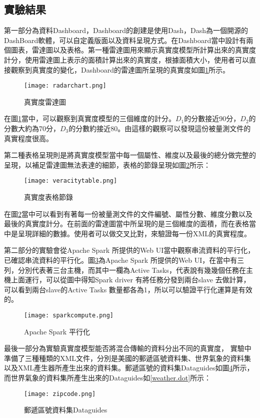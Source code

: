 \subsection{實驗結果}
第一部分為資料Dashboard，Dashboard的創建是使用Dash\cite{dash}，Dash為一個開源的DashBoard軟體，可以自定義版面以及資料呈現方式。在Dashboard當中設計有兩個圖表，雷達圖以及表格。第一種雷達圖用來顯示真實度模型所計算出來的真實度計分，使用雷達圖上表示的面積計算出來的真實度，根據面積大小，使用者可以直接觀察到真實度的變化，Dashboard的雷達圖所呈現的真實度如圖\ref{radarchart}所示。
\begin{figure}[H]
\centering
\graphicspath{{/Users/FUDA/Documents/masterThesis/image/}}
\texttt{[image: radarchart.png]}
\caption{真實度雷達圖}
\label{radarchart}
\end{figure}

在圖\ref{radarchart}當中，可以觀察到真實度模型的三個維度的計分。$D_1$的分數接近90分，$D_2$的分數大約為70分，$D_3$的分數約接近80。由這樣的觀察可以發現這份被量測文件的真實程度很高。\\\par
第二種表格呈現則是將真實度模型當中每一個屬性、維度以及最後的總分做完整的呈現，以補足雷達圖無法表達的細節，表格的節錄呈現如圖\ref{veracitytable}所示：
\begin{figure}[H]
\centering
\graphicspath{{/Users/FUDA/Documents/masterThesis/image/}}
\texttt{[image: veracitytable.png]}
\caption{真實度表格節錄}
\label{veracitytable}
\end{figure}
在圖\ref{veracitytable}當中可以看到有著每一份被量測文件的文件編號、屬性分數、維度分數以及最後的真實度計分。在前面的雷達圖當中所呈現的是三個維度的面積，而在表格當中是呈現詳細的數據。使用者可以做交叉比對，來驗證每一份XML的真實程度。\\\par
第二部分的實驗會從Apache Spark 所提供的Web UI當中觀察串流資料的平行化，已確認串流資料的平行化。圖\ref{sparkcompute}為Apache Spark 所提供的Web UI，在當中有三列，分別代表著三台主機，而其中一欄為Active Tasks，代表說有幾幾個任務在主機上面運行，可以從圖中得知Spark driver 有將任務分發到兩台slave 去做計算，可以看到兩台slave的Active Tasks 數量都各為1，所以可以驗證平行化運算是有效的。
\begin{figure}[H]
\centering
\graphicspath{{/Users/FUDA/Documents/masterThesis/image/}}
\texttt{[image: sparkcompute.png]}
\caption{Apache Spark 平行化}
\label{sparkcompute}
\end{figure}
最後一部分為實驗真實度模型能否將混合傳輸的資料分出不同的真實度， 實驗中準備了三種種類的XML文件，分別是美國的郵遞區號資料集\cite{usazipcode}、世界氣象的資料集\cite{worldweather}以及XML產生器所產生出來的資料集。郵遞區號的資料集Dataguides如圖\ref{zipcode.dot}所示，而世界氣象的資料集所產生出來的Dataguides如\ref{weather.dot}所示：
\begin{figure}[H]
\centering
\graphicspath{{/Users/FUDA/Documents/masterThesis/image/}}
\texttt{[image: zipcode.png]}
\caption{郵遞區號資料集Dataguides}
\label{zipcode.dot}
\end{figure}

